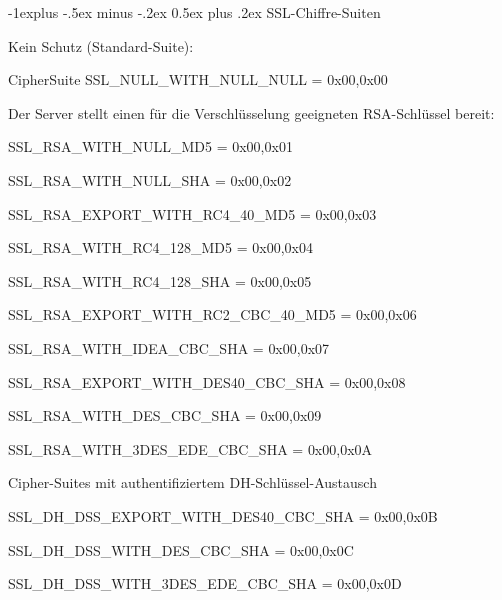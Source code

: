 \documentclass[a4paper]{article}
\makeatletter
\renewcommand{\subsection}{\@startsection{subsection}{2}{0mm}%
 {-1explus -.5ex minus -.2ex}%
 {0.5ex plus .2ex}%
 {\normalfont\normalsize\bfseries}}
\makeatother
\begin{document}
\begin{multicols}{3}
\begin{itemize*}
            \subsection{SSL-Chiffre-Suiten}
            \begin{itemize*}
                  \item Kein Schutz (Standard-Suite):
                  \begin{itemize*}
                        \item CipherSuite SSL\_NULL\_WITH\_NULL\_NULL = { 0x00,0x00 }
                  \end{itemize*}
                  \item Der Server stellt einen für die Verschlüsselung geeigneten
                  RSA-Schlüssel bereit:
                  \begin{itemize*}
                        \item SSL\_RSA\_WITH\_NULL\_MD5 = { 0x00,0x01 }
                        \item SSL\_RSA\_WITH\_NULL\_SHA = { 0x00,0x02 }
                        \item SSL\_RSA\_EXPORT\_WITH\_RC4\_40\_MD5 = { 0x00,0x03 }
                        \item SSL\_RSA\_WITH\_RC4\_128\_MD5 = { 0x00,0x04 }
                        \item SSL\_RSA\_WITH\_RC4\_128\_SHA = { 0x00,0x05 }
                        \item SSL\_RSA\_EXPORT\_WITH\_RC2\_CBC\_40\_MD5 = { 0x00,0x06 }
                        \item SSL\_RSA\_WITH\_IDEA\_CBC\_SHA = { 0x00,0x07 }
                        \item SSL\_RSA\_EXPORT\_WITH\_DES40\_CBC\_SHA = { 0x00,0x08 }
                        \item SSL\_RSA\_WITH\_DES\_CBC\_SHA = { 0x00,0x09 }
                        \item SSL\_RSA\_WITH\_3DES\_EDE\_CBC\_SHA = { 0x00,0x0A }
                  \end{itemize*}
                  \item Cipher-Suites mit authentifiziertem DH-Schlüssel-Austausch
                  \begin{itemize*}
                        \item SSL\_DH\_DSS\_EXPORT\_WITH\_DES40\_CBC\_SHA = { 0x00,0x0B }
                        \item SSL\_DH\_DSS\_WITH\_DES\_CBC\_SHA = { 0x00,0x0C }
                        \item SSL\_DH\_DSS\_WITH\_3DES\_EDE\_CBC\_SHA = { 0x00,0x0D }

\end{itemize*}
\end{itemize*}
\end{itemize*}
\end{multicols}
\end{document}
